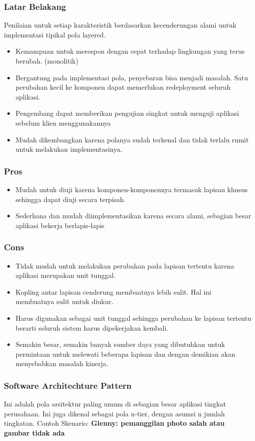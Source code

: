 \documentclass{beamer}
\begin{document}
\begin{frame}
\frametitle{Latar Belakang}
Penilaian untuk setiap karakteristik berdasarkan kecenderungan alami untuk implementasi tipikal pola layered.
\begin{itemize}
	\item Kemampuan untuk merespon dengan cepat terhadap lingkungan yang terus berubah. (monolitik)
	\item Bergantung pada implementasi pola, penyebaran bisa menjadi masalah. Satu perubahan kecil ke komponen dapat memerlukan redeployment seluruh aplikasi.
	\item Pengembang dapat memberikan pengujian singkat untuk menguji aplikasi sebelum klien menggunakannya
	\item Mudah dikembangkan karena polanya sudah terkenal dan tidak terlalu rumit untuk melakukan implementasinya.
\end{itemize}
\end{frame}

\begin{frame}
\frametitle{Pros}
\begin{itemize}
	\item Mudah untuk diuji karena komponen-komponennya termasuk lapisan khusus sehingga dapat diuji secara terpisah.
	\item Sederhana dan mudah diimplementasikan karena secara alami, sebagian besar aplikasi bekerja berlapis-lapis
\end{itemize}
\end{frame}

\begin{frame}
\frametitle{Cons}
\begin{itemize}
	\item Tidak mudah untuk melakukan perubahan pada lapisan tertentu karena aplikasi merupakan unit tunggal.
	\item Kopling antar lapisan cenderung membuatnya lebih sulit. Hal ini membuatnya sulit untuk diukur.
	\item Harus digunakan sebagai unit tunggal sehingga perubahan ke lapisan tertentu berarti seluruh sistem harus dipekerjakan kembali.
	\item Semakin besar, semakin banyak sumber daya yang dibutuhkan untuk permintaan untuk melewati beberapa lapisan dan dengan demikian akan menyebabkan masalah kinerja.
\end{itemize}
\end{frame}

\begin{frame}
\frametitle{Software Architechture Pattern}
Ini adalah pola arsitektur paling umum di sebagian besar aplikasi tingkat perusahaan. Ini juga dikenal sebagai pola n-tier, dengan asumsi n jumlah tingkatan. Contoh Skenario:
\textbf{\color{blue} Glenny: pemanggilan photo salah atau gambar tidak ada}
\end{frame}
\end{document}
